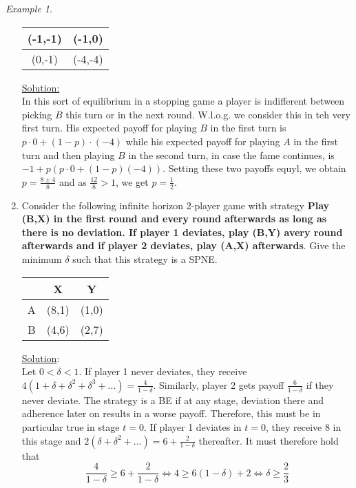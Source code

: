 \documentclass[a4paper, 12pt]{article}
\theoremstyle{plain}
\theoremstyle{definition}
\theoremstyle{lemma}
\theoremstyle{remark}
\theoremstyle{corollary}
\theoremstyle{example}
\newtheorem{example}[theorem]{Example}
\begin{document}
\begin{example}
\begin{enumerate}
\begin{center}
\begin{table}[h]
\begin{tabular}{|c|c|}
						\hline
						(-1,-1) & (-1,0)\\
						\hline
						(0,-1) & (-4,-4)\\
						\hline
					\end{tabular}
				\end{table}
			\end{center}
			\underline{Solution:}\\
			In this sort of equilibrium in a stopping game a player is indifferent between picking $B$ this turn or in the next round. W.l.o.g. we consider this in teh very first turn. His expected payoff for playing $B$ in the first turn is $p\cdot 0 + (1-p)\cdot (-4)$ while his expected payoff for playing $A$ in the first turn and then playing $B$ in the second turn, in case the fame continues, is $-1+p(p\cdot 0 + (1-p)(-4))$. Setting these two payoffs equyl, we obtain $p = \frac{8 \pm 4}{8}$ and as $\frac{12}{8}>1$, we get $p = \frac{1}{2}$.
			\item Consider the following infinite horizon 2-player game with strategy \textbf{Play (B,X) in the first round and every round afterwards as long as there is no deviation. If player 1 deviates, play (B,Y) avery round afterwards and if player 2 deviates, play (A,X) afterwards}. Give the minimum $\delta$ such that this strategy is a SPNE.
			\begin{center}
				\begin{table}[h]
					\centering
					\begin{tabular}{c|c|c|}
						 & X & Y\\
						\hline
						A & (8,1) & (1,0)\\
						\hline
						B & (4,6) & (2,7)\\
						\hline
					\end{tabular}
				\end{table}
			\end{center}
			\underline{Solution}:\\
			Let $0 < \delta < 1$. If player 1 never deviates, they receive $4(1+\delta + \delta^2 + \delta^3 + ...) = \frac{4}{1-\delta}$. Similarly, player 2 gets payoff $\frac{6}{1-\delta}$ if they never deviate. The strategy is a BE if at any stage, deviation there and adherence later on results in a worse payoff. Therefore, this must be in particular true in stage $t=0$.
			If player 1 deviates in $t=0$, they receive 8 in this stage and $2(\delta + \delta^2 + ...) = 6 + \frac{2}{1-\delta}$ thereafter. It must therefore hold that \[\frac{4}{1-\delta} \geq 6+\frac{2}{1-\delta} \Leftrightarrow 4 \geq 6(1-\delta) + 2 \Leftrightarrow \delta \geq \frac{2}{3}\]

\end{enumerate}
\end{example}
\end{document}

